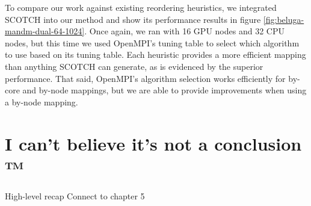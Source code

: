 To compare our work against existing reordering heuristics, we integrated SCOTCH \cite{Pellegrini2012SCOTCH} into our method and show its performance results in figure \ref{fig:beluga-mandm-dual-64-1024}.
Once again, we ran with 16 GPU nodes and 32 CPU nodes, but this time we used OpenMPI's tuning table to select which algorithm to use based on its tuning table.
Each heuristic provides a more efficient mapping than anything SCOTCH can generate, as is evidenced by the superior performance. 
That said, OpenMPI's algorithm selection works efficiently for by-core and by-node mappings, but we are able to provide improvements when using a by-node mapping.  

\section{I can't believe it's not a conclusion ™}
High-level recap
Connect to chapter 5 


